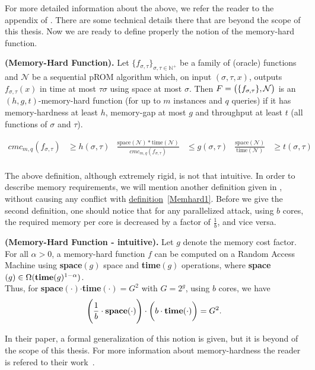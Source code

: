 For more detailed information about the above, we refer the reader to the appendix of \cite{cryptoeprint:2016:875}. There are some technical details there that are beyond the scope of this thesis. Now we are ready to define properly the notion of the memory-hard function.

\begin{definition}{\textbf{(Memory-Hard Function).}}{\label{Memhard1}} \textnormal{\cite{cryptoeprint:2016:875}}
  Let $\{ f_{\sigma, \tau} \}_{\sigma, \tau \in \mathbb{N}^{+}}$ be a family of (oracle) functions and $\mathcal{N}$ be a sequential pROM algorithm which, on input $(\sigma, \tau, x)$, outputs $f_{\sigma, \tau}(x)$ in time at most $\tau \sigma$ using space at most $\sigma$. Then $F=\big{(} \{ f_{\sigma,\tau} \}, \mathcal{N} \big{)}$
  is an $(h,g,t)$-memory-hard function (for up to $m$ instances and $q$ queries) if it has memory-hardness at least $h$, memory-gap at most $g$ and throughput at least $t$ (all functions of $\sigma$ and $\tau$).

\begin{align*}
cmc_{m,q}(f_{\sigma, \tau})&\geq h(\sigma, \tau)           &  \frac{\mbox{space}(\mathcal{N})*\mbox{time}(\mathcal{N})}{cmc_{m,q}(f_{\sigma, \tau})} &\leq g(\sigma, \tau)             &  \frac{\mbox{space}(\mathcal{N})}{\mbox{time}(\mathcal{N})} &\geq t(\sigma, \tau)\\
\end{align*}
%
\end{definition}

The above definition, although extremely rigid, is not that intuitive. In order to describe memory requirements, we will mention another definition given in \cite{ForlerLW13}, without causing any conflict with \hyperref[Memhard1]{definition}~\ref{Memhard1}. Before we give the second definition, one should notice that for any parallelized attack, using $b$ cores, the required memory per core is decreased by a factor of $\frac{1}{b}$, and vice versa.

\begin{definition}{\textbf{(Memory-Hard Function - intuitive).}}\textnormal{\cite{ForlerLW13}}
  Let $g$ denote the memory cost factor. For all $\alpha > 0$, a memory-hard function $f$ can be computed on a Random Access Machine using \textbf{space}$(g)$ space and \textbf{time}$(g)$ operations, where \textbf{space}$(g) \in \Omega(\mbox{\textbf{time}}(g)^{1-\alpha})$.\\

  \noindent Thus, for \textbf{space}$(\cdot)$\:$\cdot$\:\textbf{time}$(\cdot)$\:$=G^2$ with $G=2^g$, using $b$ cores, we have
  \begin{equation}\label{eqn:memhard}
    \Bigg{(} \frac{1}{b} \cdot \mbox{\textbf{space}}(\cdot) \Bigg{)} \cdot \bigg{(} b \cdot \mbox{\textbf{time}}(\cdot) \bigg{)} = G^2.
  \end{equation}
\end{definition}
In their paper, a formal generalization of this notion is given, but it is beyond of the scope of this thesis. For more information about memory-hardness the reader is refered to their work~\cite{ForlerLW13}.
%
